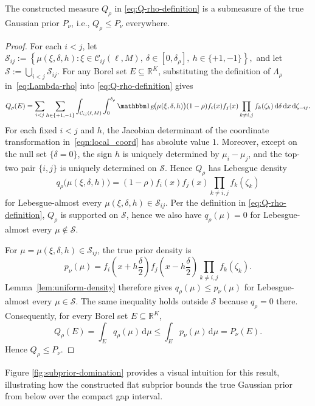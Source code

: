 \documentclass[10pt]{article}
\newcommand{\dd}{\mathrm{d}}
\theoremstyle{plain}
\begin{document}

\begin{lemma}[Domination]
\label{lem:subprior-domination}
The constructed measure $Q_\rho$ in \eqref{eq:Q-rho-definition} is a submeasure of the true Gaussian prior $P_\nu$, i.e., $Q_\rho \le P_\nu$ everywhere.
\end{lemma}

\begin{proof}%
For each $i<j$, let
$
\mathcal S_{ij}
:=
\left\{
\mu(\xi,\delta,h):
\xi\in\mathcal C_{ij}(\ell,M),\
\delta\in[0,\delta_\rho],\
h\in\{+1,-1\}
\right\},$
and let $\mathcal{S}:=\bigcup_{i<j}\mathcal S_{ij}$. For any Borel set $E\subseteq\mathbb R^K$, substituting the definition of
$\Lambda_\rho$ in~\eqref{eq:Lambda-rho} into \eqref{eq:Q-rho-definition} gives
\[
Q_\rho(E)
=
\sum_{i<j}\sum_{h\in\{+1,-1\}}
\int_{\mathcal C_{ij}(\ell,M)}
\int_0^{\delta_\rho}
\mathbbm 1_E\!\bigl(\mu(\xi,\delta,h)\bigr)
(1-\rho)f_i(x)f_j(x)
\prod_{k\neq i,j}f_k(\zeta_k)
\,\dd\delta\,\dd x\,\dd\zeta_{-ij}.
\]
For each fixed $i<j$ and $h$, the Jacobian determinant of the coordinate transformation in~\eqref{eqn:local_coord} has absolute value $1$.
Moreover, except on the null set $\{\delta=0\}$, the sign $h$ is uniquely
determined by $\mu_i-\mu_j$, and the top-two pair $\{i,j\}$ is uniquely
determined on $\mathcal{S}$. Hence $Q_\rho$ has Lebesgue density
\[
q_\rho\bigl(\mu(\xi,\delta,h)\bigr)
=
(1-\rho)f_i(x)f_j(x)
\prod_{k\neq i,j}f_k(\zeta_k)
\]
for Lebesgue-almost every
$\mu(\xi,\delta,h)\in\mathcal S_{ij}$. Per the definition in
\eqref{eq:Q-rho-definition}, $Q_\rho$ is supported on $\mathcal{S}$, hence we also have $q_\rho(\mu)=0$ for Lebesgue-almost every $\mu\notin\mathcal{S}$.


For $\mu=\mu(\xi,\delta,h)\in\mathcal S_{ij}$, the true prior density is
\[
p_\nu(\mu)
=
f_i\left(x+h\frac{\delta}{2}\right)
f_j\left(x-h\frac{\delta}{2}\right)
\prod_{k\neq i,j}f_k(\zeta_k).
\]
Lemma~\ref{lem:uniform-density} therefore gives
$q_\rho(\mu)\le p_\nu(\mu)$ for Lebesgue-almost every
$\mu\in\mathcal{S}$. The same inequality holds outside
$\mathcal{S}$ because $q_\rho=0$ there. Consequently, for every
Borel set $E\subseteq\mathbb R^K$,
\[
Q_\rho(E)
=
\int_E q_\rho(\mu)\,\dd\mu
\le
\int_E p_\nu(\mu)\,\dd\mu
=
P_\nu(E).
\]
Hence $Q_\rho\le P_\nu$.   
\end{proof}
Figure \ref{fig:subprior-domination} provides a visual intuition for this result, illustrating how the constructed flat subprior bounds the true Gaussian prior from below over the compact gap interval.
\end{document}
